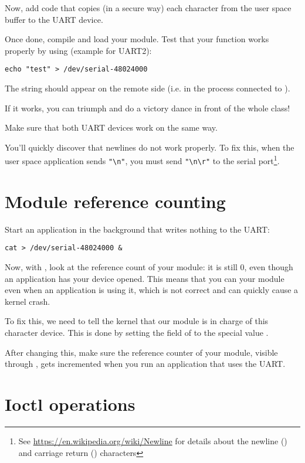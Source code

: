 Now, add code that copies (in a secure way) each character from the
user space buffer to the UART device.

Once done, compile and load your module. Test that your  function
works properly by using (example for UART2):

\begin{verbatim}
echo "test" > /dev/serial-48024000
\end{verbatim}

The  string should appear on the remote side (i.e. in
the  process connected to ).

If it works, you can triumph and do a victory dance in front of the
whole class!

Make sure that both UART devices work on the same way.

You'll quickly discover that newlines do not work properly. To fix
this, when the user space application sends \verb+"\n"+, you must send
\verb+"\n\r"+ to the serial port\footnote{See
\url{https://en.wikipedia.org/wiki/Newline} for details about the
newline (\code{\n}) and carriage return (\code{\r}) characters}.

\section{Module reference counting}

Start an application in the background that writes nothing to the
UART:

\begin{verbatim}
cat > /dev/serial-48024000 &
\end{verbatim}

Now, with , look at the reference count of your module: it
is still 0, even though an application has your device opened. This
means that you can  your module even when an application
is using it, which is not correct and can quickly cause a kernel
crash.

To fix this, we need to tell the kernel that our module is in charge
of this character device. This is done by setting the 
field of  to the special value
.

After changing this, make sure the reference counter of your module,
visible through , gets incremented when you run an
application that uses the UART.

\section{Ioctl operations}

